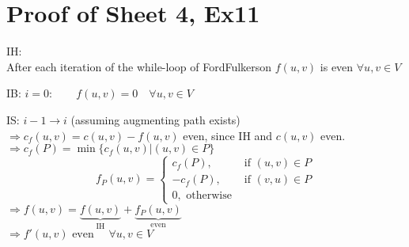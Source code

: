 \documentclass[12pt,oneside,a4paper,parskip=on,fleqn]{scrartcl}
\begin{document}
\section{Proof of Sheet 4, Ex11} %
\label{sec:proof_of_sheet_4_ex11}
	IH:\\
	After each iteration of the while-loop of FordFulkerson $f(u,v)$ is even $\forall u,v \in V$

	IB: $i=0:\qquad f(u,v) = 0\quad \forall u,v\in V$

	IS: $i-1\rightarrow i$ (assuming augmenting path exists)\\
	$\Rightarrow c_f(u,v) = c(u,v) - f(u,v)$ even, since IH and $c(u,v)$ even.\\
	$\Rightarrow c_f(P) = \min\{ c_f(u,v) | (u,v) \in P \}$\\
	\[
		f_P(u,v) = \begin{cases}
			c_f(P), &\text{ if } (u,v) \in P\\
			-c_f(P), &\text{ if } (v,u) \in P\\
			0, \text{ otherwise}
		\end{cases}
	\]
	$\Rightarrow f(u,v) = \underbrace{f(u,v)}_{\text{IH}} + \underbrace{f_P(u,v)}_{\text{even}}$\\
	$\Rightarrow f'(u,v) \text{ even }\quad \forall u,v\in V$

\end{document}
